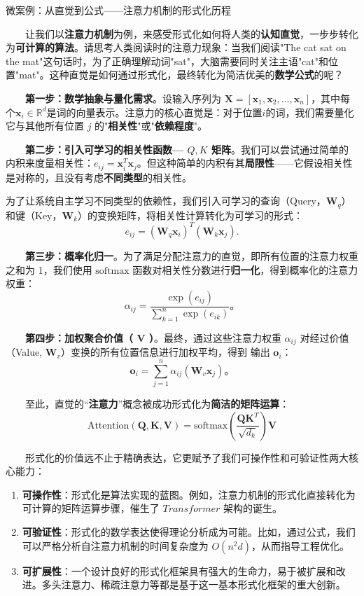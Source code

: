 \begin{microcase}{微案例：从直觉到公式——注意力机制的形式化历程}

　　让我们以\textbf{注意力机制}为例，来感受形式化如何将人类的\textbf{认知直觉}，一步步转化为\textbf{可计算的算法}。请思考人类阅读时的注意力现象：当我们阅读"The cat sat on the mat"这句话时，为了正确理解动词"sat"，大脑需要同时关注主语"cat"和位置"mat"。这种直觉是如何通过形式化，最终转化为简洁优美的\textbf{数学公式}的呢？

　　\textbf{第一步：数学抽象与量化需求}。设输入序列为 $\mathbf{X} = [\mathbf{x}_1, \mathbf{x}_2, ..., \mathbf{x}_n]$，其中每个$\mathbf{x}_i \in \mathbb{R}^d$是词的向量表示。注意力的核心直觉是：对于位置$i$的词，我们需要量化它与其他所有位置 $j$ 的"\textbf{相关性}"或"\textbf{依赖程度}"。

　　\textbf{第二步：引入可学习的相关性函数--- $Q, K$ 矩阵}。我们可以尝试通过简单的内积来度量相关性：$e_{ij} = \mathbf{x}_i^T \mathbf{x}_j$。但这种简单的内积有其\textbf{局限性}——它假设相关性是对称的，且没有考虑\textbf{不同类型}的相关性。

为了让系统自主学习不同类型的依赖性，我们引入可学习的查询（Query，$\mathbf{W}_q$）和键（Key，$\mathbf{W}_k$）的变换矩阵，将相关性计算转化为可学习的形式：
$$e_{ij} = (\mathbf{W}_q \mathbf{x}_i)^T (\mathbf{W}_k \mathbf{x}_j).$$

　　\textbf{第三步：概率化归一}。为了满足分配注意力的直觉，即所有位置的注意力权重之和为 1，我们使用 $\text{softmax}$ 函数对相关性分数进行\textbf{归一化}，得到概率化的注意力权重：
$$\alpha_{ij} = \frac{\exp(e_{ij})}{\sum_{k=1}^{n} \exp(e_{ik})}。$$

　　\textbf{第四步：加权聚合价值（ $\mathbf{V}$ ）}。最终，通过这些注意力权重 $\alpha_{ij} $ 对经过价值（Value, $\mathbf{W}_v$）变换的所有位置信息进行加权平均，得到 输出 $\mathbf{o}_i$： 
$$\mathbf{o}_i = \sum_{j=1}^{n} \alpha_{ij} (\mathbf{W}_v \mathbf{x}_j)。$$

　　至此，直觉的“\textbf{注意力}”概念被成功形式化为\textbf{简洁的矩阵运算}：
$$\text{Attention}(\mathbf{Q}, \mathbf{K}, \mathbf{V}) = \text{softmax}\left(\frac{\mathbf{Q}\mathbf{K}^T}{\sqrt{d_k}}\right)\mathbf{V}$$


　　形式化的价值远不止于精确表达，它更赋予了我们可操作性和可验证性两大核心能力：

\begin{enumerate}
\item \textbf{可操作性}：形式化是算法实现的蓝图。例如，注意力机制的形式化直接转化为可计算的矩阵运算步骤，催生了 $\textit{Transformer}$ 架构的诞生。
\item \textbf{可验证性}：形式化的数学表达使得理论分析成为可能。比如，通过公式，我们可以严格分析自注意力机制的时间复杂度为 $O(n^2 d)$，从而指导工程优化。
\item \textbf{可扩展性}：一个设计良好的形式化框架具有强大的生命力，易于被扩展和改进。多头注意力、稀疏注意力等都是基于这一基本形式化框架的重大创新。
\end{enumerate}
\end{microcase}
